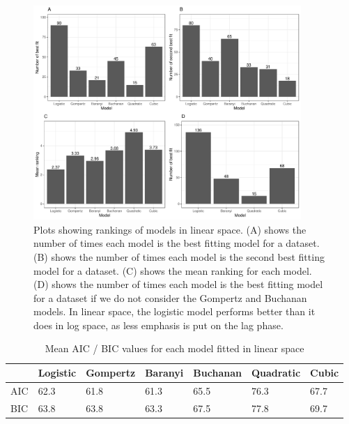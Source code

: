 \documentclass[11pt, a4paper]{article}
\begin{document}
        
                \begin{figure}[H]
        \includegraphics[width=4in]{../results/best_fit_frequency_bar_linear.pdf}
        \centering
        \caption{Plots showing rankings of models in linear space. (A) shows the number of times each model is the best fitting model for a dataset. (B) shows the number of times each model is the second best fitting model for a dataset. (C) shows the mean ranking for each model. (D) shows the number of times each model is the best fitting model for a dataset if we do not consider the Gompertz and Buchanan models.  In linear space, the logistic model performs better than it does in log space, as less emphasis is put on the lag phase.}
        \label{sup:frequency_bar_linear}
        \end{figure} 
        
                        \begin{table}[H]
\centering
\begin{tabular}{l|llllll}
       & Logistic & Gompertz & Baranyi & Buchanan & Quadratic & Cubic \\ \hline
AIC & 62.3    & 61.8    & 61.3   & 65.5    & 76.3     & 67.7 \\
BIC & 63.8    & 63.8    & 63.3   & 67.5    & 77.8     & 69.7
\end{tabular}
\caption{Mean AIC / BIC values for each model fitted in linear space}
\label{suptable:meanAICBIClinear}
\end{table}
\end{document}

